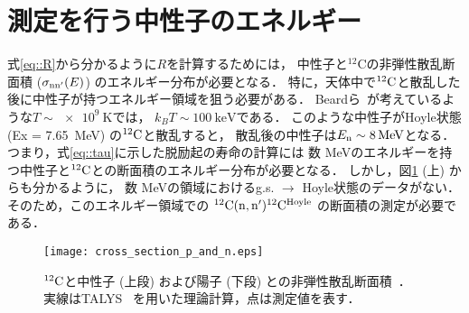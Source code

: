 \documentclass[../master]{subfiles}
\begin{document}
\section{測定を行う中性子のエネルギー}
式\eqref{eq::R}から分かるように$R$を計算するためには，
中性子と${}^{12}\mathrm{C}$の非弾性散乱断面積 ($\sigma_{\rm nn'} (E)$) のエネルギー分布が必要となる．
特に，天体中で${}^{12}{\rm C}$と散乱した後に中性子が持つエネルギー領域を狙う必要がある．
Beardら~\cite{hotdensemedium}が考えているような$T\sim\SI{e9}{\kelvin}$では，
$k_{B}T\sim\SI{100}{\kilo\electronvolt}$である．%
このような中性子がHoyle状態 (Ex = \SI{7.65}{\mega\electronvolt}) の${}^{12}{\rm C}$と散乱すると，
散乱後の中性子は$E_{\rm n}\sim\SI{8}{\mega\electronvolt}$となる．
つまり，式\eqref{eq::tau}に示した脱励起の寿命の計算には
数 \si{\mega\electronvolt}のエネルギーを持つ中性子と${}^{12}{\rm C}$との断面積のエネルギー分布が必要となる．
しかし，図\ref{fig::crosssection_pres} (上) からも分かるように，
数 \si{\mega\electronvolt}の領域におけるg.s. $\rightarrow$ Hoyle状態のデータがない．
そのため，このエネルギー領域での ${}^{12}{\rm C}({\rm n,n'}){}^{12}{\rm C}^{{\rm Hoyle}}$ の断面積の測定が必要である．
\begin{figure}
  \centering
  \texttt{[image: cross\_section\_p\_and\_n.eps]}
  \caption[${}^{12}{\rm C}$と中性子 (上段) および陽子 (下段) との非弾性散乱断面積．]
          {${}^{12}{\rm C}$と中性子 (上段) および陽子 (下段) との非弾性散乱断面積~\cite{hotdensemedium}．
  実線はTALYS~\cite{talys-1.0} を用いた理論計算，点は測定値を表す．}
  \label{fig::crosssection_pres}
\end{figure}
\end{document}
